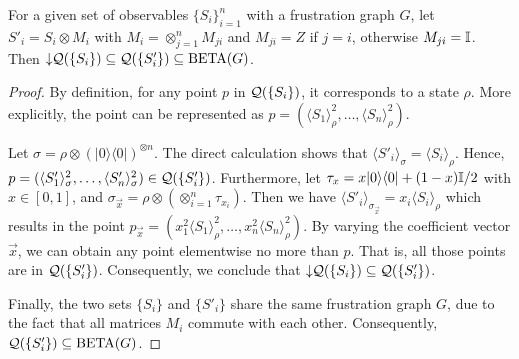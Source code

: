 \begin{lemma}\label{lm:repdown}
For a given set of observables $\{S_i\}_{i=1}^n$ with a frustration graph $G$, let $S'_i = S_i\otimes M_i$ with $M_i = \otimes_{j=1}^n M_{ji}$ and $M_{ji}=Z$ if $j=i$, otherwise $M_{ji} = \mathbb{I}$. Then $\downarrow\hspace{-0.3em}{\cal Q}(\{S_i\}) \subseteq {\cal Q}(\{S'_i\}) \subseteq \operatorname{BETA}(G)$.
\end{lemma}
\begin{proof}
	By definition, for any point $p$ in ${\cal Q}(\{S_i\})$, it corresponds to a state $\rho$. More explicitly, the point can be represented as 
	$p = (\langle S_1\rangle_{\rho}^2, \ldots, \langle S_n\rangle_{\rho}^2)$.

	Let $\sigma = \rho \otimes (|0\rangle\langle 0|)^{\otimes n}$. The direct calculation shows that $\langle S'_i\rangle_{\sigma} = \langle S_i\rangle_{\rho}$. 
Hence,
	$p = (\langle S'_1\rangle_{\sigma}^2, \ldots, \langle S'_n\rangle_{\sigma}^2) \in {\cal Q}(\{S'_i\})$.
	Furthermore, let $\tau_x = x |0\rangle\langle 0| + (1-x)\mathbb{I}/2$ with $x\in [0,1]$, and $\sigma_{\vec{x}} = \rho\otimes(\otimes_{i=1}^n \tau_{x_i})$. Then we have $\langle S'_i\rangle_{\sigma_{\vec{x}}} = x_i \langle S_i\rangle_{\rho}$ which results in the point $p_{\vec{x}} = (x_1^2 \langle S_1\rangle_{\rho}^2, \ldots, x_n^2 \langle S_n\rangle_{\rho}^2)$. By varying the coefficient vector $\vec{x}$, we can obtain any point elementwise no more than $p$. That is, all those points are in ${\cal Q}(\{S'_i\})$. Consequently, we conclude that $\downarrow\hspace{-0.3em}{\cal Q}(\{S_i\}) \subseteq {\cal Q}(\{S'_i\})$.

 Finally, the two sets $\{S_i\}$ and $\{S'_i\}$ share the same frustration graph $G$, due to the fact that all matrices $M_i$ commute with each other. Consequently, ${\cal Q}(\{S'_i\}) \subseteq \operatorname{BETA}(G)$.
\end{proof}

